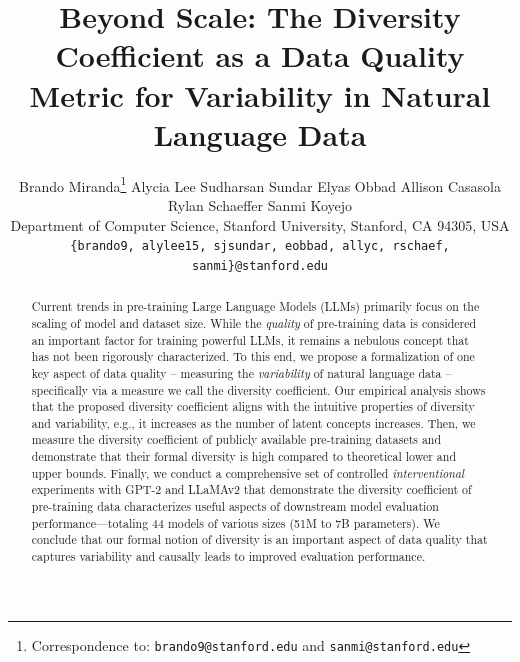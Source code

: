 \documentclass[twoside,11pt]{article}
\begin{document}
\title{Beyond Scale: The Diversity Coefficient as a Data Quality Metric for Variability in Natural Language Data}

\author{%
  \name Brando Miranda\thanks{Correspondence to: \texttt{brando9@stanford.edu} and \texttt{sanmi@stanford.edu}}
  \AND
  \name Alycia Lee \AND
  \name Sudharsan Sundar \AND
  \name Elyas Obbad \AND
  \name Allison Casasola \AND
  \name Rylan Schaeffer \AND
  \name Sanmi Koyejo \\
  \addr Department of Computer Science, Stanford University, Stanford, CA 94305, USA \\
  \texttt{\{brando9, alylee15, sjsundar, eobbad, allyc, rschaef, sanmi\}@stanford.edu}
}


\maketitle

\begin{abstract}
Current trends in pre-training Large Language Models (LLMs) primarily focus on the scaling of model and dataset size.
While the \textit{quality} of pre-training data is considered an important factor for training powerful LLMs, it remains a nebulous concept that has not been rigorously characterized.
To this end, we propose a formalization of one key aspect of data quality -- measuring the \textit{variability} of natural language data -- specifically via a measure we call the diversity coefficient.
Our empirical analysis shows that the proposed diversity coefficient aligns with the intuitive properties of diversity and variability,
e.g., it increases as the number of latent concepts increases.
Then, we measure the diversity coefficient of publicly available pre-training datasets and demonstrate that their formal diversity is high compared to theoretical lower and upper bounds.
Finally, we conduct a comprehensive set of controlled \textit{interventional} experiments with GPT-2 and LLaMAv2 that demonstrate the diversity coefficient of pre-training data characterizes useful aspects of downstream model evaluation performance---totaling 44 models of various sizes (51M to 7B parameters).
We conclude that our formal notion of diversity is an important aspect of data quality that captures variability and causally leads to improved evaluation performance.
\end{abstract}
\end{document}
